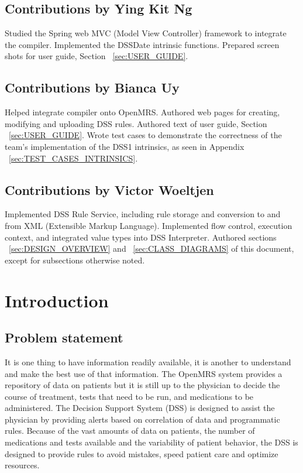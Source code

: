 \documentclass[12pt,letterpaper]{article}
\begin{document}
\subsection{Contributions by Ying Kit Ng}
Studied the Spring web MVC (Model View Controller) framework to integrate 
the compiler. Implemented the DSSDate intrinsic functions. Prepared screen 
shots for user guide, Section ~\ref{sec:USER_GUIDE}.

\subsection{Contributions by Bianca Uy}
Helped integrate compiler onto OpenMRS.
Authored web pages for creating, modifying and uploading DSS rules.
Authored text of user guide, Section ~\ref{sec:USER_GUIDE}.
Wrote test cases to demonstrate the correctness of the team's implementation 
of the DSS1 intrinsics, as seen in Appendix ~\ref{sec:TEST_CASES_INTRINSICS}.

\subsection{Contributions by Victor Woeltjen}
Implemented DSS Rule Service, including rule storage and conversion to and from XML (Extensible Markup Language). Implemented flow control, execution 
context, and integrated value types into DSS Interpreter. Authored sections 
~\ref{sec:DESIGN_OVERVIEW} and
~\ref{sec:CLASS_DIAGRAMS} of this document, except for subsections otherwise noted.


\newpage 
\section{Introduction} \label{sec:INTRODUCTION}

\subsection{Problem statement}

It is one thing to have information readily available, it is another to understand and make the best use of that information.  The OpenMRS system provides a repository of data on patients but it is still up to the physician to decide the course of treatment, tests that need to be run, and medications to be administered.  The Decision Support System (DSS) is designed to assist the physician by providing alerts based on correlation of data and programmatic rules.  Because of the vast amounts of data on patients, the number of medications and tests available and the variability of patient behavior, the DSS is designed to provide rules to avoid mistakes, speed patient care and optimize resources.
\end{document}
